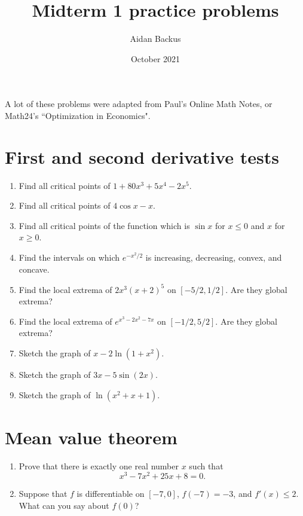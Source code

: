 \documentclass[reqno,12pt,letterpaper]{amsart}
\title{Midterm 1 practice problems}
\author{Aidan Backus}
\date{October 2021}
\theoremstyle{definition}
\numberwithin{equation}{section}
\begin{document}




A lot of these problems were adapted from Paul's Online Math Notes, or Math24's ``Optimization in Economics".

\section{First and second derivative tests}
\begin{enumerate}
\item Find all critical points of $1 + 80x^3 + 5x^4 - 2x^5$.
\item Find all critical points of $4 \cos x - x$.
\item Find all critical points of the function which is $\sin x$ for $x \leq 0$ and $x$ for $x \geq 0$.
\item Find the intervals on which $e^{-x^2/2}$ is increasing, decreasing, convex, and concave.
\item Find the local extrema of $2x^3 (x + 2)^5$ on $[-5/2, 1/2]$. Are they global extrema?
\item Find the local extrema of $e^{x^3 - 2x^2 - 7x}$ on $[-1/2, 5/2]$. Are they global extrema?
\item Sketch the graph of $x - 2 \ln(1 + x^2)$.
\item Sketch the graph of $3x - 5 \sin(2x)$.
\item Sketch the graph of $\ln(x^2 + x + 1)$.
\end{enumerate}

\section{Mean value theorem}
\begin{enumerate}
\item Prove that there is exactly one real number $x$ such that
$$x^3 - 7x^2 + 25x + 8 = 0.$$
\item Suppose that $f$ is differentiable on $[-7, 0]$, $f(-7) = -3$, and $f'(x) \leq 2$. What can you say about $f(0)$?
\end{enumerate}
\end{document}
